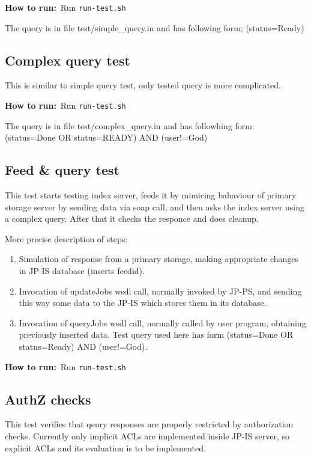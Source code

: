 \documentclass{egee}
\def\how{\noindent\textbf{How to run:}}
\begin{document}
\how\ Run \texttt{run-test.sh}

\begin{hints} 
The query is in file test/simple\_query.in and has following
  form: (status=Ready)
\end{hints}

\subsection{Complex query test}
This is similar to simple query test, only tested query is more complicated.

\how\ Run \texttt{run-test.sh}

\begin{hints}
The query is in file test/complex\_query.in and has followhing
  form: (status=Done OR status=READY) AND (user!=God)
\end{hints}

\subsection{Feed \& query test}
This test starts testing index server, feeds it by
mimicing bahaviour of primary storage server by sending data
via soap call, and then asks the index server using a complex
query. After that it checks the responce and does cleanup.

More precise description of steps:
\begin{enumerate}
 \item Simulation of response from a primary storage, making appropriate
   changes in JP-IS database (inserts feedid).
 \item Invocation of updateJobs wsdl call, normally invoked by JP-PS, and
   sending this way some data to the JP-IS which stores them in its database.
 \item Invocation of queryJobs wsdl call, normally called by user
   program, obtaining previously inserted data. Test query used here has form
   (status=Done OR status=Ready) AND (user!=God).
\end{enumerate}

\how\ Run \texttt{run-test.sh}

\subsection{AuthZ checks}
This test verifies that qeury responses are properly restricted by
authorization checks. Currently only implicit ACLs are implemented
inside JP-IS server, so explicit ACLs and its evaluation is to be implemented.
\end{document}
